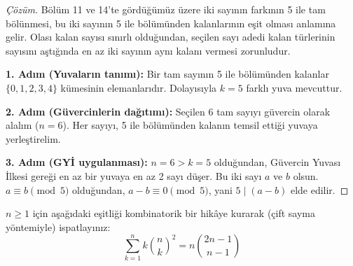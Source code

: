 \begin{proof}[Çözüm]
Bölüm 11 ve 14'te gördüğümüz üzere iki sayının farkının 5 ile tam bölünmesi, bu iki sayının 5 ile bölümünden kalanlarının eşit olması anlamına gelir. Olası kalan sayısı sınırlı olduğundan, seçilen sayı adedi kalan türlerinin sayısını aştığında en az iki sayının aynı kalanı vermesi zorunludur.

\textbf{1. Adım (Yuvaların tanımı):}
Bir tam sayının 5 ile bölümünden kalanlar $\{0, 1, 2, 3, 4\}$ kümesinin elemanlarıdır. Dolayısıyla $k = 5$ farklı yuva mevcuttur.

\textbf{2. Adım (Güvercinlerin dağıtımı):}
Seçilen 6 tam sayıyı güvercin olarak alalım ($n = 6$).
Her sayıyı, 5 ile bölümünden kalanın temsil ettiği yuvaya yerleştirelim.

\textbf{3. Adım (GYİ uygulanması):}
$n = 6 > k = 5$ olduğundan, Güvercin Yuvası İlkesi gereği en az bir yuvaya en az 2 sayı düşer.
Bu iki sayı $a$ ve $b$ olsun. $a \equiv b \pmod 5$ olduğundan, $a - b \equiv 0 \pmod 5$, yani $5 \mid (a - b)$ elde edilir.
\end{proof}

\begin{example}
$n \ge 1$ için aşağıdaki eşitliği kombinatorik bir hikâye kurarak (çift sayma yöntemiyle) ispatlayınız:
\[
\sum_{k=1}^n k \binom{n}{k}^2 = n \binom{2n-1}{n-1}
\]
\end{example}

